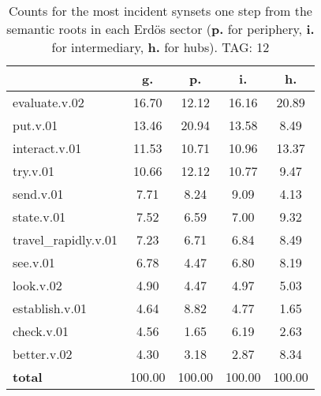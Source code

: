 \begin{table}[h!]
\begin{center}
\begin{tabular}{| l || c | c | c | c |}\hline
 & {\bf g.} & {\bf p.} & {\bf i.} & {\bf h.} \\\hline\hline
evaluate.v.02 & 16.70  & 12.12  & 16.16  & 20.89 \\\hline
put.v.01 & 13.46  & 20.94  & 13.58  & 8.49 \\\hline
interact.v.01 & 11.53  & 10.71  & 10.96  & 13.37 \\\hline
try.v.01 & 10.66  & 12.12  & 10.77  & 9.47 \\\hline
send.v.01 & 7.71  & 8.24  & 9.09  & 4.13 \\\hline
state.v.01 & 7.52  & 6.59  & 7.00  & 9.32 \\\hline
travel\_rapidly.v.01 & 7.23  & 6.71  & 6.84  & 8.49 \\\hline
see.v.01 & 6.78  & 4.47  & 6.80  & 8.19 \\\hline
look.v.02 & 4.90  & 4.47  & 4.97  & 5.03 \\\hline
establish.v.01 & 4.64  & 8.82  & 4.77  & 1.65 \\\hline
check.v.01 & 4.56  & 1.65  & 6.19  & 2.63 \\\hline
better.v.02 & 4.30  & 3.18  & 2.87  & 8.34 \\\hline\hline
{{\bf total}} & 100.00  & 100.00  & 100.00  & 100.00 \\\hline
\end{tabular}
\caption{Counts for the most incident synsets one step from the semantic roots in each Erd\"os sector ({\bf p.} for periphery, {\bf i.} for intermediary, {\bf h.} for hubs). TAG: 12}
\end{center}
\end{table}
